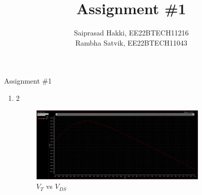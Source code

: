 \documentclass[journal, onecolumn]{IEEEtran} %
\begin{document}
\title{Assignment \#1}
\author{Saiprasad Hakki, \normalsize{EE22BTECH11216}\\
		Rambha Satvik, \normalsize{EE22BTECH11043}}%
\maketitle
{}%
{Assignment \#1}

\begin{enumerate}[2.]
	\item2 {
		\begin{figure}[H]
			\centering
			\includegraphics[width=0.8\textwidth]{VtVd}
			\caption{$V_{T}$ vs $V_{DS}$}
			\label{fig:VtVd}
		\end{figure}
	}

\end{enumerate}
\end{document}
